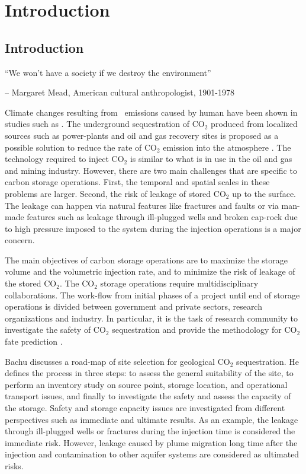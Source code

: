 \chapter{Introduction}
%
 \pagebreak

\section{Introduction}
\label{sec:Introduction}
``We won’t have a society if we destroy the environment''

\small{-- Margaret Mead,  American cultural anthropologist, 1901-1978}
\vspace{2.5cm} 

Climate changes resulting from \coo\ emissions caused by human have been shown in studies such as \cite{houghton2001climate}. The
underground sequestration of $\mbox{CO}_2$ produced from localized sources
such as power-plants and oil and gas recovery sites is proposed as a possible
solution to reduce the rate of $\mbox{CO}_2$ emission into the atmosphere
\cite{hitchon1999sedimentary,bradshaw2001geological}. The technology
required to inject $\mbox{CO}_2$ is similar to what is in use in the oil and gas and mining
industry. However, there are two main challenges that are specific to carbon storage
operations. First, the temporal and spatial scales in these problems are larger.
Second, the risk of leakage of stored $\mbox{CO}_2$ up to the surface. The leakage can happen via
natural features like fractures and faults or via man-made features such as
leakage through ill-plugged wells and broken cap-rock due to high pressure
imposed to the system during the injection operations is a major concern. 

The main objectives of carbon storage operations are to maximize the storage
volume and the volumetric injection rate, and to minimize the risk of leakage of
the stored $\mbox{CO}_2$. The $\mbox{CO}_2$ storage operations require multidisciplinary collaborations. The work-flow from initial phases of a project
until end of storage operations is divided between government and private
sectors, research organizations and industry. In particular, it is the task of research
community to investigate the safety of $\mbox{CO}_2$ sequestration and provide
the methodology for $\mbox{CO}_2$ fate prediction \cite{bachu2000sequestration}.

Bachu \cite{bachu2000sequestration} discusses a road-map of site selection for
geological $\mbox{CO}_2$ sequestration. He defines the process in three steps:
to assess the general suitability of the site, to perform an inventory study on source point, storage location, and operational transport issues, and
finally to investigate the safety and assess the capacity of the storage. Safety and storage capacity issues are investigated from different perspectives such as immediate and ultimate results. As an example, the leakage through ill-plugged wells or fractures
during the injection time is considered the immediate risk. However, leakage caused by plume migration long time after the injection and contamination to
other aquifer systems are considered as ultimated risks. 


